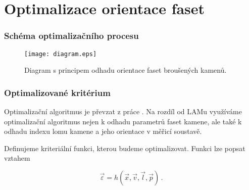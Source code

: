 \part{Optimalizace orientace faset}
	
\section{Schéma optimalizačního procesu}

%
%

\begin{figure} [h!]
\centering
\texttt{[image: diagram.eps]}
\caption{Diagram s principem odhadu orientace faset broušených kamenů.}
\label{fig:diagram}
\end{figure}

\clearpage


\section{Optimalizované kritérium}
\label{sec:Optimalizace_crit}
Optimalizační algoritmus je převzat z práce \cite{Bodlak2005}. Na rozdíl od LAMu využíváme optimalizační algoritmus nejen k odhadu parametrů faset kamene, ale také k odhadu indexu lomu kamene a jeho orientace v měřicí soustavě.

Definujeme kriteriální funkci, kterou budeme optimalizovat. Funkci lze popsat vztahem 

\begin{equation}
\vec{\varepsilon} = h\left(\vec{x},\vec{v},\vec{l},\vec{p} \right)\,.
\label{eq: opt_criter}
\end{equation}

